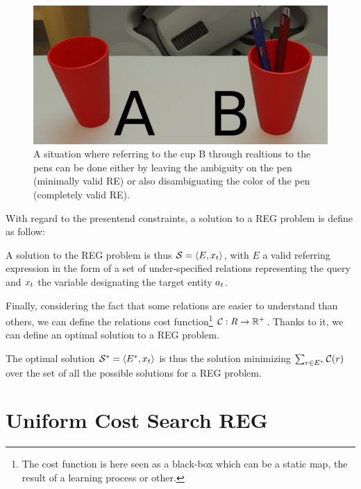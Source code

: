 \begin{figure}[h!]
\centering
\includegraphics[scale=0.15]{figures/chapter4/complet_validity.png}
\caption{\label{fig:chap4_complet} A situation where referring to the cup B through realtions to the pens can be done either by leaving the ambiguity on the pen (minimally valid RE) or also disambiguating the color of the pen (completely valid RE). }
\end{figure}

With regard to the presentend constraints, a solution to a REG problem is define as follow:

\begin{definition}
A solution to the REG problem is thus $\mathcal{S} = \langle E, x_t \rangle$, with $E$ a valid referring expression in the form of a set of under-specified relations representing the \sparql{} query and $x_t$ the variable designating the target entity $a_t$.
\end{definition}


Finally, considering the fact that some relations are easier to understand than others, we can define the relations cost function\footnote{The cost function is here seen as a black-box which can be a static map, the result of a learning process or other.} $\mathcal{C} : R \rightarrow \mathbb{R}^+$. Thanks to it, we can define an optimal solution to a REG problem.

\begin{definition}
The optimal solution $\mathcal{S}^* = \langle E^*, x_t \rangle$ is thus the solution minimizing $\sum_{r \in E^*} \mathcal{C}(r)$ over the set of all the possible solutions for a REG problem.
\end{definition}


\section{Uniform Cost Search REG}

